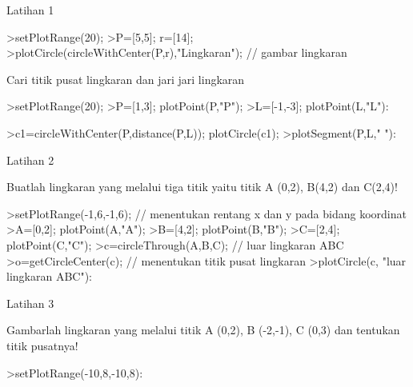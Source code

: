 \documentclass[a4paper,10pt]{article}
\begin{document}
\begin{eulernotebook}
\begin{eulercomment}
\begin{eulercomment}
\begin{eulercomment}
Latihan 1\\
\end{eulercomment}
\eulersubheading{}
\begin{eulerprompt}
>setPlotRange(20);
>P=[5,5]; r=[14];
>plotCircle(circleWithCenter(P,r),"Lingkaran"); // gambar lingkaran
\end{eulerprompt}
\begin{eulercomment}
Cari titik pusat lingkaran dan jari jari lingkaran
\end{eulercomment}
\begin{eulerprompt}
>setPlotRange(20);
>P=[1,3]; plotPoint(P,"P");
>L=[-1,-3]; plotPoint(L,"L"):
\end{eulerprompt}
\begin{eulerprompt}
>c1=circleWithCenter(P,distance(P,L)); plotCircle(c1);
>plotSegment(P,L," "):
\end{eulerprompt}
\begin{eulercomment}
Latihan 2\\
\end{eulercomment}
\eulersubheading{}
\begin{eulercomment}
Buatlah lingkaran yang melalui tiga titik yaitu titik A (0,2), B(4,2)
dan C(2,4)!
\end{eulercomment}
\begin{eulerprompt}
>setPlotRange(-1,6,-1,6); // menentukan rentang x dan y pada bidang koordinat
>A=[0,2]; plotPoint(A,"A"); 
>B=[4,2]; plotPoint(B,"B");
>C=[2,4]; plotPoint(C,"C");
>c=circleThrough(A,B,C); // luar lingkaran ABC
>o=getCircleCenter(c); // menentukan titik pusat lingkaran
>plotCircle(c, "luar lingkaran ABC"):
\end{eulerprompt}
\begin{eulercomment}
Latihan 3\\
\end{eulercomment}
\eulersubheading{}
\begin{eulercomment}
Gambarlah lingkaran yang melalui titik A (0,2), B (-2,-1), C (0,3) dan
tentukan titik pusatnya!
\end{eulercomment}
\begin{eulerprompt}
>setPlotRange(-10,8,-10,8):

\end{eulerprompt}
\end{eulercomment}
\end{eulercomment}
\end{eulernotebook}
\end{document}
